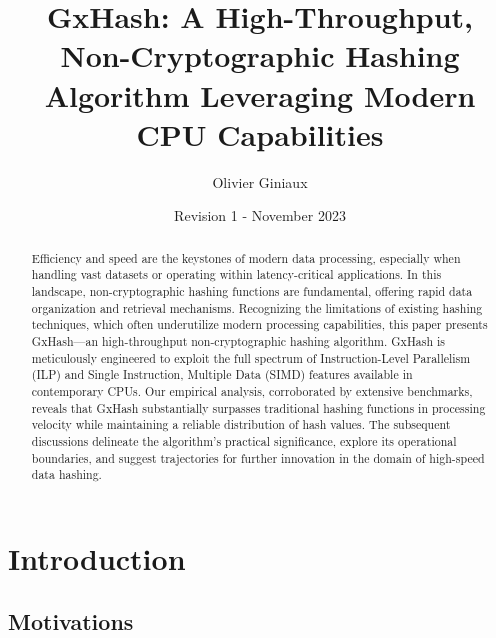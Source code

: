 \documentclass[10pt]{article}
\title{GxHash: A High-Throughput, Non-Cryptographic Hashing Algorithm Leveraging Modern CPU Capabilities}
\author{Olivier Giniaux}
\date{Revision 1 - November 2023}
\begin{document}
\maketitle

\begin{abstract}

Efficiency and speed are the keystones of modern data processing, especially when handling vast datasets or operating within latency-critical applications. In this landscape, non-cryptographic hashing functions are fundamental, offering rapid data organization and retrieval mechanisms. Recognizing the limitations of existing hashing techniques, which often underutilize modern processing capabilities, this paper presents GxHash—an high-throughput non-cryptographic hashing algorithm. GxHash is meticulously engineered to exploit the full spectrum of Instruction-Level Parallelism (ILP) and Single Instruction, Multiple Data (SIMD) features available in contemporary CPUs. Our empirical analysis, corroborated by extensive benchmarks, reveals that GxHash substantially surpasses traditional hashing functions in processing velocity while maintaining a reliable distribution of hash values. The subsequent discussions delineate the algorithm's practical significance, explore its operational boundaries, and suggest trajectories for further innovation in the domain of high-speed data hashing.

\end{abstract}

\begin{multicols}{2}
\tableofcontents
\end{multicols}

\clearpage
\section{Introduction}

\subsection{Motivations}
\end{document}
